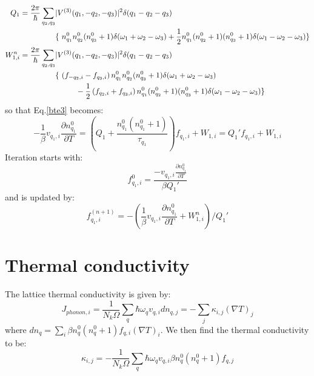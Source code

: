 \documentclass{article}
\newcommand{\pfrac}[2]{\frac{\partial #1}{\partial #2}}
\begin{document}
\begin{align}
    Q_1 = \frac{2\pi}{\hbar} \sum_{q_2,q_3} & |V^{(3)}(q_1, -q_2, -q_3)|^2 \delta(q_1 - q_2 - q_3) \notag \\ 
    & \{\  n_{q_1}^0 n_{q_2}^0 (n_{q_3}^0 + 1) \delta(\omega_1 + \omega_2 - \omega_3) + \frac{1}{2} n_{q_1}^0 (n_{q_2}^0+1) (n_{q_3}^0 + 1) \delta(\omega_1 - \omega_2 - \omega_3) \} \\
    W_{1,i}^n = \frac{2\pi}{\hbar} \sum_{q_2,q_3} & |V^{(3)}(q_1, -q_2, -q_3)|^2 \delta(q_1 - q_2 - q_3) \notag \\ 
    & \{\ \left(f_{-q_2,i} - f_{q_3,i} \right)  n_{q_1}^0 n_{q_2}^0 (n_{q_3}^0 + 1) \delta(\omega_1 + \omega_2 - \omega_3) \notag \\
    & \ \ \ \ \ \ \ \ -\frac{1}{2} \left( f_{q_2,i} + f_{q_3,i} \right) n_{q_1}^0 (n_{q_2}^0+1) (n_{q_3}^0 + 1) \delta(\omega_1 - \omega_2 - \omega_3) \}
\end{align}
so that Eq.\ref{bte3} becomes:
\begin{equation}
    - \frac{1}{\beta} v_{q_1,i} \pfrac{n_{q_1}^0}{T} = \left( Q_1 + \frac{n_{q_1}^0(n_{q_1}^0+1)}{\tau_{q_1}} \right) f_{q_1,i} + W_{1,i} = Q_1' f_{q_1,i} + W_{1,i} 
\end{equation}
Iteration starts with:
\begin{equation}
    f_{q_1,i}^0 = \frac{-v_{q_1,i} \pfrac{n_{q_1}^0}{T}}{\beta Q_1'}
\end{equation}
and is updated by:
\begin{equation}
    f_{q_1,i}^{(n+1)} = - ( \frac{1}{\beta} v_{q_1,i} \pfrac{n_{q_1}^0}{T} + W_{1,i}^{n} ) / Q_1'
\end{equation}

\section{Thermal conductivity}
The lattice thermal conductivity is given by:
\begin{equation}
    J_{phonon,i} = \frac{1}{N_k \Omega}\sum_q \hbar \omega_q v_{q,i} dn_{q,j} = -\sum_j \kappa_{i,j} \left( \nabla T \right)_j \label{jp} 
\end{equation}
where $dn_q = \sum_i \beta n_q^0(n_q^0+1)f_{q,i} \left( \nabla T \right)_i $. We then find the thermal conductivity to be:
\begin{equation}
    \kappa_{i,j} = -\frac{1}{N_k \Omega}\sum_q \hbar \omega_q v_{q,i} \beta n_q^0(n_q^0+1)f_{q,j}
\end{equation}
\end{document}

